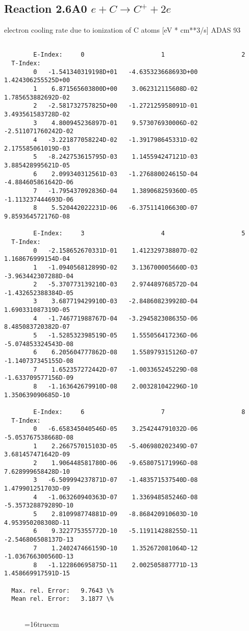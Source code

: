 \documentclass[12pt,dvipdfmx]{article}
\begin{document}
\subsection{
  Reaction 2.6A0  $e + C  \rightarrow C^+   + 2e $
}
electron cooling rate due to ionization of C atoms [eV * cm**3/s]
ADAS 93

\begin{small}\begin{verbatim}

        E-Index:     0                     1                     2
  T-Index:
        0   -1.541340319198D+01   -4.635323668693D+00    1.424306255525D+00
        1    6.871565603800D+00    3.062312115608D-02    1.785653882692D-02
        2   -2.581732757825D+00   -1.272125958091D-01    3.493561583728D-02
        3    4.800945236897D-01    9.573076930006D-02   -2.511071760242D-02
        4   -3.221877058224D-02   -1.391798645331D-02    2.175585061019D-03
        5   -8.242753615795D-03    1.145594247121D-03    3.885428995621D-05
        6    2.099340312561D-03   -1.276880024615D-04   -4.884605861642D-06
        7   -1.795437092836D-04    1.389068259360D-05   -1.113237444693D-06
        8    5.520442022231D-06   -6.375114106630D-07    9.859364572176D-08

        E-Index:     3                     4                     5
  T-Index:
        0   -2.158652670331D-01    1.412329738807D-02    1.168676999154D-04
        1   -1.094056812899D-02    3.136700005660D-03   -3.963442307288D-04
        2   -5.370773139210D-03    2.974489768572D-04   -1.432652388384D-05
        3    3.687719429910D-03   -2.848608239928D-04    1.690331087319D-05
        4   -1.746771988767D-04   -3.294582308635D-06    8.485083720382D-07
        5   -1.528532398519D-05    1.555056417236D-06   -5.074853324543D-08
        6    6.205604777862D-08    1.558979315126D-07   -1.140737345155D-08
        7    1.652357272442D-07   -1.003365245229D-08   -1.633709577156D-09
        8   -1.163642679910D-08    2.003281042296D-10    1.350639090685D-10

        E-Index:     6                     7                     8
  T-Index:
        0   -6.658345040546D-05    3.254244791032D-06   -5.053767538668D-08
        1    2.266757015103D-05   -5.406980202349D-07    3.681457471642D-09
        2    1.906448581780D-06   -9.658075171996D-08    7.628999658428D-10
        3   -6.509994237871D-07   -1.483571537540D-08    1.479901251703D-09
        4   -1.063260940363D-07    1.336948585246D-08   -5.357328879289D-10
        5    2.810998774881D-09   -8.868420910603D-10    4.953950208308D-11
        6    9.322775355772D-10   -5.119114288255D-11   -2.546806508137D-13
        7    1.240247466159D-10    1.352672081064D-12   -1.036766300560D-13
        8   -1.122860695875D-11    2.002505887771D-13    1.458669917591D-15

  Max. rel. Error:   9.7643 \%
  Mean rel. Error:   3.1877 \%


\end{verbatim}\end{small}
\begin{figure} \label{2.6il}
\epsfxsize=16truecm
\end{figure}
\newpage
\end{document}
